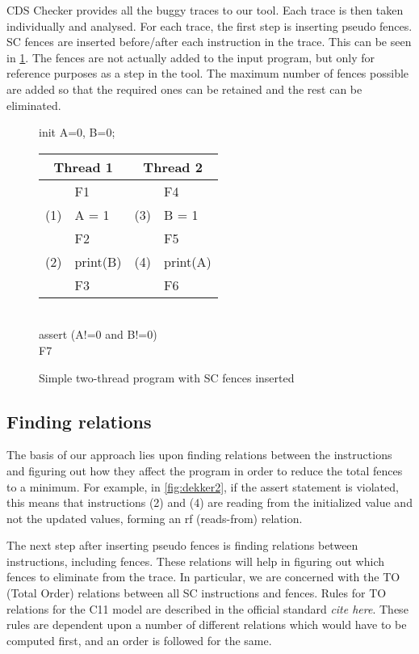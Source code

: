 \par
CDS Checker provides all the buggy traces to our tool. Each trace is then taken individually and analysed. For each trace, the first step is inserting pseudo fences. SC fences are inserted before/after each instruction in the trace. This can be seen in \ref{fig:dekker3}. The fences are not actually added to the input program, but only for reference purposes as a step in the tool. The maximum number of fences possible are added so that the required ones can be retained and the rest can be eliminated.

\begin{figure}[!htb]
\begin{center}
init A=0, B=0;\\
    \begin{tabular}{c l | c l }
     \multicolumn{2}{c|}{Thread 1} & \multicolumn{2}{c}{Thread 2} \\ 
     \hline
     & F1 & & F4 \\
     (1) & A = 1 & (3) & B = 1 \\  
     & F2 & & F5 \\
     (2) & print(B) & (4) &  print(A)\\
     & F3 & & F6 \\
    \end{tabular}\\
assert (A!=0 and B!=0)\\
F7
    \caption{Simple two-thread program with SC fences inserted}\label{fig:dekker3}
\end{center}
\end{figure}

\subsection{Finding relations}
The basis of our approach lies upon finding relations between the instructions and figuring out how they affect the program in order to reduce the total fences to a minimum. For example, in \ref{fig:dekker2}, if the assert statement is violated, this means that instructions (2) and (4) are reading from the initialized value and not the updated values, forming an rf (reads-from) relation.

\par
The next step after inserting pseudo fences is finding relations between instructions, including fences. These relations will help in figuring out which fences to eliminate from the trace. In particular, we are concerned with the TO (Total Order) relations between all SC instructions and fences. Rules for TO relations for the C11 model are described in the official standard \textit{\color{pink}cite here}. These rules are dependent upon a number of different relations which would have to be computed first, and an order is followed for the same.

